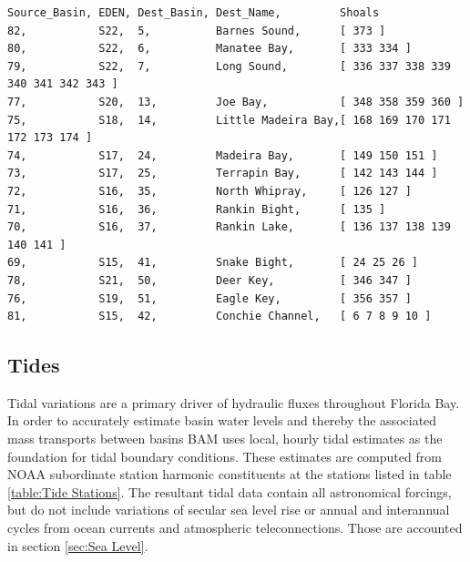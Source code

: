 \small
\begin{verbatim}
Source_Basin, EDEN, Dest_Basin, Dest_Name,         Shoals
82,           S22,  5,          Barnes Sound,      [ 373 ]
80,           S22,  6,          Manatee Bay,       [ 333 334 ]
79,           S22,  7,          Long Sound,        [ 336 337 338 339 340 341 342 343 ]
77,           S20,  13,         Joe Bay,           [ 348 358 359 360 ]
75,           S18,  14,         Little Madeira Bay,[ 168 169 170 171 172 173 174 ]
74,           S17,  24,         Madeira Bay,       [ 149 150 151 ]
73,           S17,  25,         Terrapin Bay,      [ 142 143 144 ]
72,           S16,  35,         North Whipray,     [ 126 127 ]
71,           S16,  36,         Rankin Bight,      [ 135 ]
70,           S16,  37,         Rankin Lake,       [ 136 137 138 139 140 141 ]
69,           S15,  41,         Snake Bight,       [ 24 25 26 ]
78,           S21,  50,         Deer Key,          [ 346 347 ]
76,           S19,  51,         Eagle Key,         [ 356 357 ]
81,           S15,  42,         Conchie Channel,   [ 6 7 8 9 10 ]
\end{verbatim}
\large

\subsection{Tides}
\label{sec:Tides}
Tidal variations are a primary driver of hydraulic fluxes throughout Florida Bay.  In order to accurately estimate basin water levels and thereby the associated mass transports between basins BAM uses local, hourly tidal estimates as the foundation for tidal boundary conditions.  These estimates are computed from NOAA subordinate station harmonic constituents at the stations listed in table \ref{table:Tide Stations}.  The resultant tidal data contain all astronomical forcings, but do not include variations of secular sea level rise or annual and interannual cycles from ocean currents and atmospheric teleconnections.  Those are accounted in section \ref{sec:Sea Level}. 

